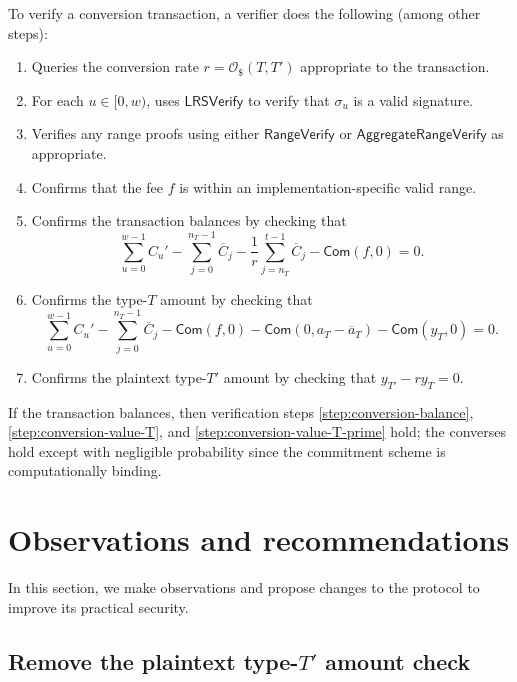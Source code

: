 \documentclass{article}
\newcommand{\func}[1]{\mathsf{#1}}
\newcommand{\com}{\func{Com}}
\newcommand{\oracle}{\mathcal{O}_{\$}}
\begin{document}
To verify a conversion transaction, a verifier does the following (among other steps):
\begin{enumerate}
    \item Queries the conversion rate $r = \oracle(T,T')$ appropriate to the transaction.
    \item For each $u \in [0,w)$, uses $\func{LRSVerify}$ to verify that $\sigma_u$ is a valid signature.
    \item Verifies any range proofs using either $\func{RangeVerify}$ or $\func{AggregateRangeVerify}$ as appropriate.
    \item Confirms that the fee $f$ is within an implementation-specific valid range.
    \item\label{step:conversion-balance} Confirms the transaction balances by checking that $$\sum_{u=0}^{w-1} C_u' - \sum_{j=0}^{n_T-1} \overline{C}_j - \frac{1}{r}\sum_{j=n_T}^{t-1} \overline{C}_j - \com(f,0) = 0.$$
    \item\label{step:conversion-value-T} Confirms the type-$T$ amount by checking that $$\sum_{u=0}^{w-1} C_u' - \sum_{j=0}^{n_T-1} \overline{C}_j - \com(f, 0) - \com(0,a_T - \overline{a}_T) - \com(y_T,0) = 0.$$
    \item\label{step:conversion-value-T-prime} Confirms the plaintext type-$T'$ amount by checking that $y_{T'} - ry_T = 0$.
\end{enumerate}

If the transaction balances, then verification steps \ref{step:conversion-balance}, \ref{step:conversion-value-T}, and \ref{step:conversion-value-T-prime} hold; the converses hold except with negligible probability since the commitment scheme is computationally binding.


\section{Observations and recommendations}

In this section, we make observations and propose changes to the protocol to improve its practical security.

\subsection{Remove the plaintext type-\texorpdfstring{$T'$}{T'} amount check}
\label{rec:remove-amount-check}
\end{document}
